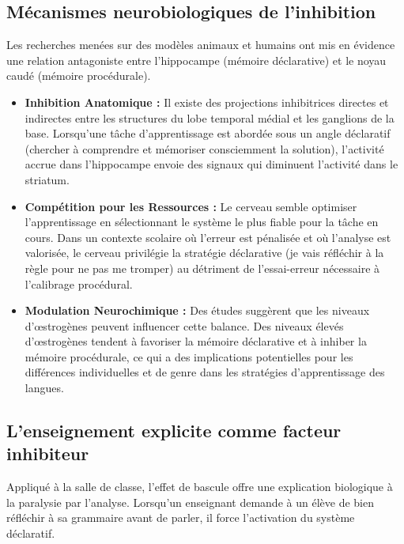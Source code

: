 \subsection{Mécanismes neurobiologiques de l'inhibition}

Les recherches menées sur des modèles animaux et humains ont mis en évidence une relation
antagoniste entre l'hippocampe (mémoire déclarative) et le noyau caudé (mémoire procédurale).

\begin{itemize}\item \textbf{Inhibition Anatomique :} Il existe des projections inhibitrices directes et indirectes entre les structures du lobe temporal médial et les ganglions de la base. Lorsqu'une tâche d'apprentissage est abordée sous un angle déclaratif (chercher à comprendre et mémoriser consciemment la solution), l'activité accrue dans l'hippocampe envoie des signaux qui diminuent l'activité dans le striatum.\cite{II-2-2-ref12}\item \textbf{Compétition pour les Ressources :} Le cerveau semble optimiser l'apprentissage en sélectionnant le système le plus \og fiable\fg{} pour la tâche en cours. Dans un contexte scolaire où l'erreur est pénalisée et où l'analyse est valorisée, le cerveau privilégie la stratégie déclarative (\og je vais réfléchir à la règle pour ne pas me tromper\fg{}) au détriment de l'essai-erreur nécessaire à l'calibrage procédural.\item \textbf{Modulation Neurochimique :} Des études suggèrent que les niveaux d'œstrogènes peuvent influencer cette balance. Des niveaux élevés d'œstrogènes tendent à favoriser la mémoire déclarative et à inhiber la mémoire procédurale, ce qui a des implications potentielles pour les différences individuelles et de genre dans les stratégies d'apprentissage des langues.\cite{II-2-2-ref4}\end{itemize}

\subsection{L'enseignement explicite comme facteur inhibiteur}

Appliqué à la salle de classe, l'effet de bascule offre une explication biologique à la \og
paralysie par l'analyse\fg{}. Lorsqu'un enseignant demande à un élève de \og bien réfléchir à sa
grammaire\fg{} avant de parler, il force l'activation du système déclaratif.

